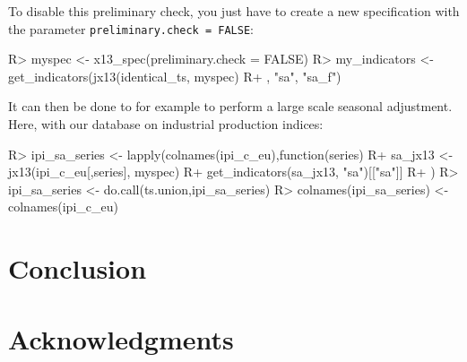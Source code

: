 \documentclass[article]{jss}
\begin{document}
To disable this preliminary check, you just have to create a new
specification with the parameter \texttt{preliminary.check\ =\ FALSE}:

\begin{CodeChunk}

\begin{CodeInput}
R> myspec <- x13_spec(preliminary.check = FALSE)
R> my_indicators <- get_indicators(jx13(identical_ts, myspec)
R+                                 , "sa", "sa_f")
\end{CodeInput}
\end{CodeChunk}

It can then be done to for example to perform a large scale seasonal
adjustment. Here, with our database on industrial production indices:

\begin{CodeChunk}

\begin{CodeInput}
R> ipi_sa_series <- lapply(colnames(ipi_c_eu),function(series){
R+   sa_jx13 <- jx13(ipi_c_eu[,series], myspec)
R+   get_indicators(sa_jx13, "sa")[["sa"]]
R+ })
R> ipi_sa_series <- do.call(ts.union,ipi_sa_series)
R> colnames(ipi_sa_series) <- colnames(ipi_c_eu)
\end{CodeInput}
\end{CodeChunk}

\hypertarget{conclusion}{%
\section{Conclusion}\label{conclusion}}

\hypertarget{acknowledgments}{%
\section{Acknowledgments}\label{acknowledgments}}

\renewcommand\refname{References}

\end{document}
